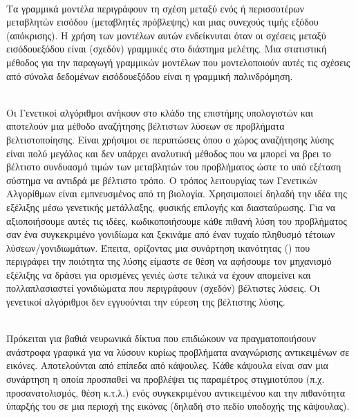 \begin{description}
    \item[Γραμμικά Μοντέλα] \hfill \\ Τα γραμμικά μοντέλα περιγράφουν τη σχέση μεταξύ ενός ή περισσοτέρων μεταβλητών εισόδου (μεταβλητές πρόβλεψης) και μιας συνεχούς τιμής εξόδου (απόκρισης). Η χρήση των μοντέλων αυτών ενδείκνυται όταν οι σχέσεις μεταξύ εισόδου\textendash εξόδου είναι (σχεδόν) γραμμικές στο διάστημα μελέτης. Μια στατιστική μέθοδος για την παραγωγή γραμμικών μοντέλων που μοντελοποιούν αυτές τις σχέσεις από σύνολα δεδομένων εισόδου\textendash εξόδου είναι η γραμμική παλινδρόμηση.
     
    \item[Γενετικοί Αλγόριθμοι] \hfill \\ Οι Γενετικοί αλγόριθμοι ανήκουν στο κλάδο της επιστήμης υπολογιστών και αποτελούν μια μέθοδο αναζήτησης βέλτιστων λύσεων σε προβλήματα βελτιστοποίησης. Είναι χρήσιμοι σε περιπτώσεις όπου ο χώρος αναζήτησης λύσης είναι πολύ μεγάλος και δεν υπάρχει αναλυτική μέθοδος που να μπορεί να βρει το βέλτιστο συνδυασμό τιμών των μεταβλητών του προβλήματος ώστε το υπό εξέταση σύστημα να αντιδρά με βέλτιστο τρόπο. Ο τρόπος λειτουργίας των Γενετικών Αλγορίθμων είναι εμπνευσμένος από τη βιολογία. Χρησιμοποιεί δηλαδή την ιδέα της εξέλιξης μέσω γενετικής μετάλλαξης, φυσικής επιλογής και διασταύρωσης. Για να αξιοποιήσουμε αυτές τις ιδέες, κωδικοποιήσουμε κάθε πιθανή λύση του προβλήματος σαν ένα συγκεκριμένο γονιδίωμα και ξεκινάμε από έναν τυχαίο πληθυσμό τέτοιων λύσεων/γονιδιωμάτων. Έπειτα, ορίζοντας μια συνάρτηση ικανότητας () που περιγράφει την ποιότητα της λύσης είμαστε σε θέση να αφήσουμε τον μηχανισμό εξέλιξης να δράσει για ορισμένες γενιές ώστε τελικά να έχουν απομείνει και πολλαπλασιαστεί γονιδιώματα που περιγράφουν (σχεδόν) βέλτιστες λύσεις. Οι γενετικοί αλγόριθμοι δεν εγγυούνται την εύρεση της βέλτιστης λύσης.
    
    \hypertarget{_capsule_networks}{
    \item[Νευρωνικά Δίκτυα με Κάψουλες (\en{Capsule Networks})]} \hfill \\ Πρόκειται για βαθιά νευρωνικά δίκτυα που επιδιώκουν να πραγματοποιήσουν ανάστροφα γραφικά για να λύσουν κυρίως προβλήματα αναγνώρισης αντικειμένων σε εικόνες. Αποτελούνται από επίπεδα από κάψουλες. Κάθε κάψουλα είναι σαν μια συνάρτηση η οποία προσπαθεί να προβλέψει τις παραμέτρος στιγμιοτύπου (π.χ. προσανατολισμός, θέση κ.τ.λ.) ενός συγκεκριμένου αντικειμένου και την πιθανότητα ύπαρξής του σε μια περιοχή της εικόνας (δηλαδή στο πεδίο υποδοχής της κάψουλας).
    

\end{description}

